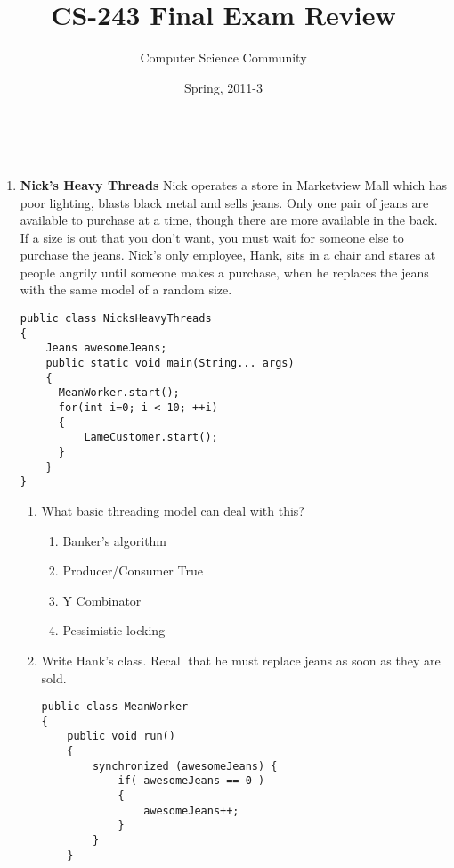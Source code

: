 \documentclass[11pt]{article}
\author{Computer Science Community}
\title{CS-243 Final Exam Review}
\date{Spring, 2011-3}
\makeatletter
\newenvironment{answer}{\large\lstset{basicstyle=\large}\color{white}}{}
\newenvironment{answer}{\large\lstset{basicstyle=\large}\color{red}}{}
\let\thetitle\@title
\let\thedate\@date
\makeatother
\begin{document}
\noindent{\Large \thetitle \hfill \thedate}\\

\begin{enumerate}

\item {\bf Nick's Heavy Threads} Nick operates a store in Marketview Mall which
      has poor lighting, blasts black metal and sells jeans. Only one pair of
      jeans are available to purchase at a time, though there are more
      available in the back. If a size is out that you don't want, you must
      wait for someone else to purchase the jeans. Nick's only employee, Hank,
      sits in a chair and stares at people angrily until someone makes a
      purchase, when he replaces the jeans with the same model of a random
      size.
    
\begin{lstlisting}
public class NicksHeavyThreads
{
    Jeans awesomeJeans;
    public static void main(String... args)
    {
      MeanWorker.start();
      for(int i=0; i < 10; ++i)
      {
          LameCustomer.start();
      }
    }
}
\end{lstlisting}

    \begin{enumerate}
    \item What basic threading model can deal with this?
        \begin{enumerate}
        \item Banker's algorithm    \begin{answer}~\end{answer}
        \item Producer/Consumer     \begin{answer}True\end{answer}
        \item Y Combinator          \begin{answer}~\end{answer}
        \item Pessimistic locking   \begin{answer}~\end{answer}
        \end{enumerate}
    
    \item Write Hank's class. Recall that he must replace jeans as soon as they
          are sold.

        \begin{answer}
\begin{lstlisting}
public class MeanWorker
{
    public void run()
    {
        synchronized (awesomeJeans) {
            if( awesomeJeans == 0 )
            {
                awesomeJeans++;
            }
        }
    }
\end{lstlisting}
        \end{answer}
    \end{enumerate}



\end{enumerate}
\end{document}

